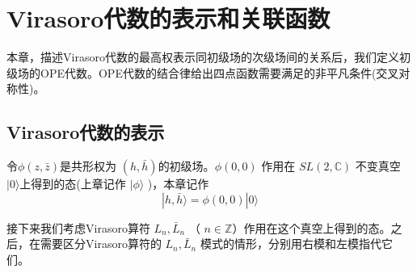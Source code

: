 \chapter{Virasoro代数的表示和关联函数}
本章，描述Virasoro代数的最高权表示同初级场的次级场间的关系后，我们定义初级场的OPE代数。OPE代数的结合律给出四点函数需要满足的非平凡条件(交叉对称性)。

\section{Virasoro代数的表示}
令$ \phi(z,\bar{z}) $是共形权为 $(h,\bar{h}) $的初级场。$ \phi(0,0)$ 作用在 $SL(2,\mathbb{C})$ 不变真空$ |0\rangle $上得到的态(上章记作 $|\phi\rangle$ )，本章记作
\begin{equation}
	|h, \bar{h}\rangle=\phi(0,0)|0\rangle
\end{equation}

接下来我们考虑Virasoro算符 $L_n,\bar{L}_n$ （ $n\in\mathbb{Z} $）作用在这个真空上得到的态。之后，在需要区分Virasoro算符的 $L_n,\bar{L}_n$ 模式的情形，分别用右模和左模指代它们。

